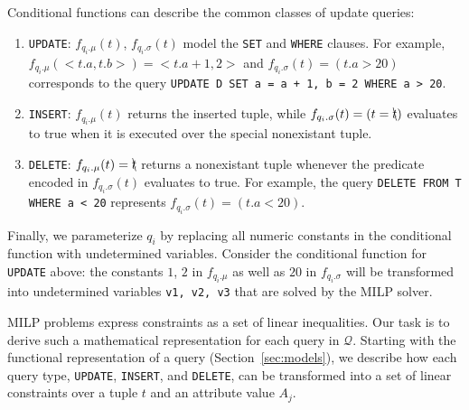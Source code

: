   Conditional functions can describe the common classes of update queries:
  \begin{enumerate}
  \item \texttt{UPDATE}: $f_{q_i.\mu}(t)$, $f_{q_i.\sigma}(t)$ model the \texttt{SET}
        and \texttt{WHERE} clauses.  For example, $f_{q_i.\mu}(<t.a, t.b>) = <t.a + 1, 2>$ and
        $f_{q_i.\sigma}(t) = (t.a > 20)$ corresponds to the query 
        \texttt{UPDATE D SET a = a + 1, b = 2 WHERE a > 20}.

  \item \texttt{INSERT}: $f_{q_i.\mu}(t)$ returns the inserted tuple, while 
        $f_{q_i.\sigma}(t) = (t = \bcancel{t})$ evaluates to true when it is executed over
        the special nonexistant tuple.

  \item \texttt{DELETE}: $f_{q_i.\mu}(t) = \bcancel{t}$ returns a nonexistant tuple whenever
        the predicate encoded in $f_{q_i.\sigma}(t)$ evaluates to true.
        For example, the query \texttt{DELETE FROM T WHERE a < 20} represents 
        $f_{q_i.\sigma}(t) = (t.a < 20)$.
        
  \end{enumerate}

  Finally, we parameterize $q_i$ by replacing all numeric constants in the
  conditional function with undetermined variables.   Consider the conditional
  function for \texttt{UPDATE} above: the constants $1$, $2$ in $f_{q_i.\mu}$
  as well as $20$ in $f_{q_i.\sigma}$ will be transformed into undetermined
  variables \texttt{v1, v2, v3} that are solved by the MILP solver.

\fi




MILP problems express constraints as a set of linear inequalities. Our
task is to derive such a mathematical representation for each query in
$\mathcal{Q}$. Starting with the functional representation of a
query (Section~\ref{sec:models}), we describe how each query type,
\texttt{UPDATE}, \texttt{INSERT}, and \texttt{DELETE}, can be
transformed into a set of linear constraints over a tuple $t$ and an
attribute value $A_j$.



